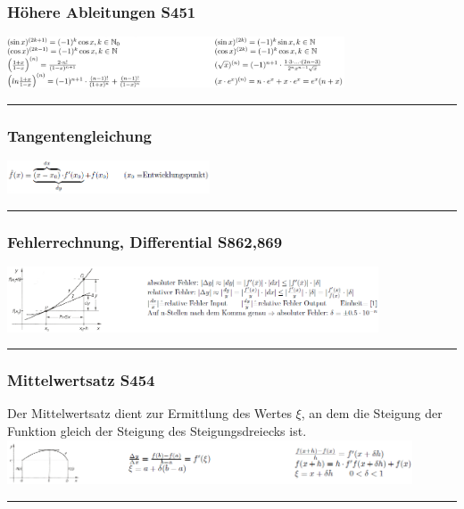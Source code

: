\documentclass[6pt,a4paper]{scrartcl}
\begin{document}
\begin{multicols*}{2}
\subsubsection{Höhere Ableitungen \color{red}S451}
\includegraphics[width=10cm]{HoehAbl.PNG}\\
\hrule
\subsubsection{Tangentengleichung}
\includegraphics[width=6cm]{Tang.PNG}\\
\hrule
\subsubsection{Fehlerrechnung, Differential \color{red}S862,869}
\includegraphics[width=11cm]{Fehlerr.PNG}\\
\hrule
\subsubsection{Mittelwertsatz \color{red}S454}
Der Mittelwertsatz dient zur Ermittlung des Wertes $\xi$, an dem die Steigung der Funktion gleich der Steigung des Steigungsdreiecks ist.
\includegraphics[width=12cm]{MWSd.PNG}\\
\hrule
\begin{multicols}{2}

\end{multicols}
\end{multicols*}
\end{document}
